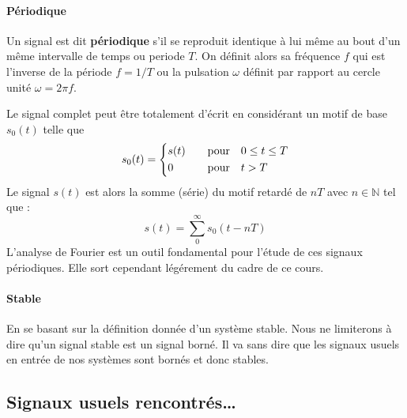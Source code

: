 \paragraph{Périodique}
Un signal est dit \textbf{périodique} s'il se reproduit identique à lui
même au bout d'un même intervalle de temps ou periode $T$. On définit alors 
sa fréquence $f$ qui est l'inverse de la période $f=1/T$ ou la pulsation 
$\omega$ définit par rapport au cercle unité $\omega=2\pi f$.
{
\begin{figure}[!htb]
\centering
{}

\end{figure}
\setlength\intextsep{0pt}
}
Le signal complet peut être totalement d'écrit en considérant un motif de base 
$s_0(t)$ telle que
\begin{align*}
s_0(t) =
\begin{dcases}
    s(t)&\quad\text{pour}\quad 0\le t\le T   \\
    0&\quad\text{pour}\quad t>T
\end{dcases}
\end{align*}
Le signal $s(t)$ est alors la somme (série) du motif retardé de $nT$ 
avec $n\in\mathbb{N}$ tel que :
$$
s(t)=\sum_0^\infty s_0(t-nT)
$$
L'analyse de Fourier est un outil fondamental pour l'étude 
de ces signaux périodiques. Elle sort cependant légérement du cadre de 
ce cours.

\paragraph{Stable}
En se basant sur la définition donnée d'un système stable.
Nous ne limiterons à dire qu'un signal stable est un signal 
borné. Il va sans dire que les signaux usuels en entrée
de nos systèmes sont bornés et donc stables.



\subsection{Signaux usuels rencontrés\ldots\label{sec-signaux_usuels}}

